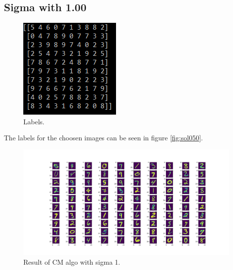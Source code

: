 \documentclass{article}
\begin{document}
\subsection{Sigma with 1.00}
\begin{figure}[!h]
  \includegraphics[width=\linewidth]{sigma_100_sol.png}
  \caption{Labels.}
  \label{fig:sol100}
\end{figure}
The labels for the choosen images can be seen in figure \ref{fig:sol050}.

\begin{figure}[h]
  \includegraphics[width=\linewidth]{sigma_100_cm.png}
  \caption{Result of CM algo with sigma 1.}
  \label{fig:cm100}
\end{figure}
\end{document}
